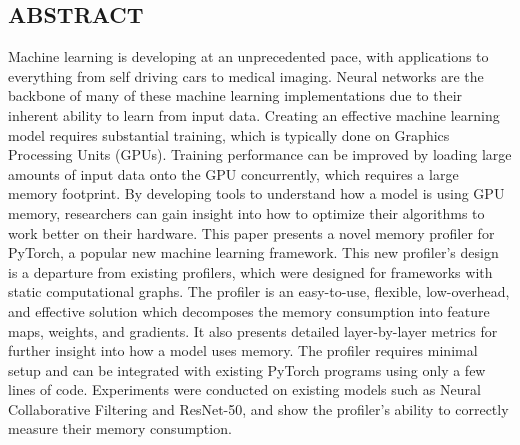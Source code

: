 \documentclass[12pt,letterpaper]{article}
\begin{document}
\thispagestyle{empty}

\clearpage
\setcounter{page}{1}
\vspace*{\fill}
\begin{singlespace}
\begin{center}
\section*{ABSTRACT}
\end{center}
Machine learning is developing at an unprecedented pace, with applications to everything from self driving cars to medical imaging. Neural networks are the backbone of many of these machine learning implementations due to their inherent ability to learn from input data. Creating an effective machine learning model requires substantial training, which is typically done on Graphics Processing Units (GPUs). Training performance can be improved by loading large amounts of input data onto the GPU concurrently, which requires a large memory footprint. By developing tools to understand how a model is using GPU memory, researchers can gain insight into how to optimize their algorithms to work better on their hardware. This paper presents a novel memory profiler for PyTorch, a popular new machine learning framework. This new profiler's design is a departure from existing profilers, which were designed for frameworks with static computational graphs. The  profiler is an easy-to-use, flexible, low-overhead, and effective solution which decomposes the memory consumption into feature maps, weights, and gradients. It also presents detailed layer-by-layer metrics for further insight into how a model uses memory. The profiler requires minimal setup and can be integrated with existing PyTorch programs using only a few lines of code. Experiments were conducted on existing models such as Neural Collaborative Filtering and ResNet-50, and show the profiler's ability to correctly measure their memory consumption.
\end{singlespace}
\vspace*{\fill}
\newpage 
\end{document}

